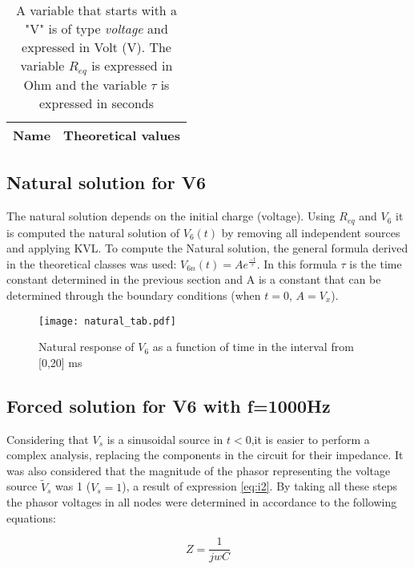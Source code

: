 \begin{table}[H]

  \centering
  \begin{tabular}{|l|r|}
    \hline    
    {\bf Name} & {\bf Theoretical values }\\ \hline
    
  \end{tabular}
  \vspace{10px}
  \caption{A variable that starts with a "V" is of type {\it voltage} and expressed in
    Volt (V). The variable $R_{eq}$ is expressed in Ohm and the variable $\tau$ is expressed in seconds }
  \label{tab:equivalent resistor}
\end{table}

\subsection{Natural solution for V6}
The natural solution depends on the initial charge (voltage). Using $R_{eq}$ and $V_6$ it is computed the natural solution of $V_6(t)$ by removing all independent sources and applying KVL. To compute the Natural solution, the general formula derived in the theoretical classes was used: $V_{6n}(t)=Ae^{\frac{-t}{\tau}}$. In this formula $\tau$ is the time constant determined in the previous section and  A is a constant that can be determined through the boundary conditions (when $t=0$, $A=V_x$).


\begin{figure}[H] \centering
\texttt{[image: natural\_tab.pdf]} 
\vspace{10px}
\caption{Natural response of $V_6$ as a function of time in the interval from [0,20] ms}
\label{fig:natural}
\end{figure} 

\subsection{Forced solution for V6 with f=1000Hz}
Considering that $V_s$ is a sinusoidal source in $t<0$,it is easier to perform a complex analysis, replacing the components in the circuit for their impedance. 
It was also  considered that the magnitude of the phasor representing the voltage source $\tilde{V}_s$ was 1 ($V_s=1$), a result of expression \ref{eq:i2}. By taking all these steps the phasor voltages in all nodes were determined in accordance to the following equations:

\begin {equation}
	Z = \frac{1}{j w C}
	\label{eq:Z}
\end{equation}

